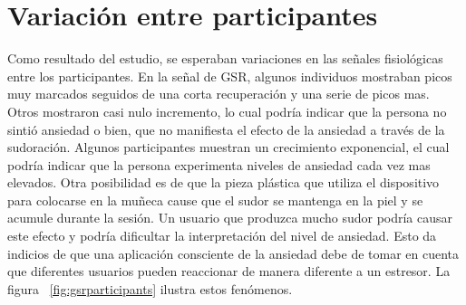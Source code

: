 

\section{Variaci\'on entre participantes}
Como resultado del estudio, se esperaban variaciones en las se\~nales fisiol\'ogicas entre los participantes. En la se\~nal de GSR, algunos individuos mostraban picos muy marcados seguidos de una corta recuperaci\'on y una serie de picos mas. Otros mostraron casi nulo incremento, lo cual podr\'ia indicar que la persona no sinti\'o ansiedad o bien, que no manifiesta el efecto de la ansiedad a trav\'es de la sudoraci\'on. Algunos participantes muestran un crecimiento exponencial, el cual podr\'ia indicar que la persona experimenta niveles de ansiedad cada vez mas elevados. Otra posibilidad es de que la pieza pl\'astica que utiliza el dispositivo para colocarse en la mu\~neca cause que el sudor se mantenga en la piel y se acumule durante la sesi\'on. Un usuario que produzca mucho sudor podr\'ia causar este efecto y podr\'ia dificultar la interpretaci\'on del nivel de ansiedad. Esto da indicios de que una aplicaci\'on consciente de la ansiedad debe de tomar en cuenta que diferentes usuarios pueden reaccionar de manera diferente a un estresor. La figura ~\ref{fig:gsrparticipants} ilustra estos fen\'omenos.


